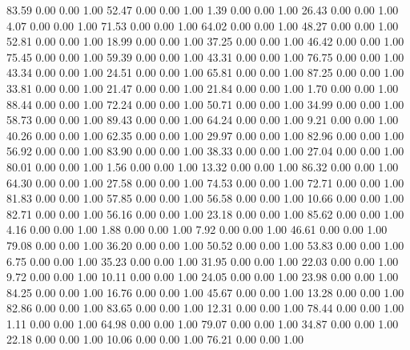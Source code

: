    83.59   0.00   0.00   1.00
   52.47   0.00   0.00   1.00
    1.39   0.00   0.00   1.00
   26.43   0.00   0.00   1.00
    4.07   0.00   0.00   1.00
   71.53   0.00   0.00   1.00
   64.02   0.00   0.00   1.00
   48.27   0.00   0.00   1.00
   52.81   0.00   0.00   1.00
   18.99   0.00   0.00   1.00
   37.25   0.00   0.00   1.00
   46.42   0.00   0.00   1.00
   75.45   0.00   0.00   1.00
   59.39   0.00   0.00   1.00
   43.31   0.00   0.00   1.00
   76.75   0.00   0.00   1.00
   43.34   0.00   0.00   1.00
   24.51   0.00   0.00   1.00
   65.81   0.00   0.00   1.00
   87.25   0.00   0.00   1.00
   33.81   0.00   0.00   1.00
   21.47   0.00   0.00   1.00
   21.84   0.00   0.00   1.00
    1.70   0.00   0.00   1.00
   88.44   0.00   0.00   1.00
   72.24   0.00   0.00   1.00
   50.71   0.00   0.00   1.00
   34.99   0.00   0.00   1.00
   58.73   0.00   0.00   1.00
   89.43   0.00   0.00   1.00
   64.24   0.00   0.00   1.00
    9.21   0.00   0.00   1.00
   40.26   0.00   0.00   1.00
   62.35   0.00   0.00   1.00
   29.97   0.00   0.00   1.00
   82.96   0.00   0.00   1.00
   56.92   0.00   0.00   1.00
   83.90   0.00   0.00   1.00
   38.33   0.00   0.00   1.00
   27.04   0.00   0.00   1.00
   80.01   0.00   0.00   1.00
    1.56   0.00   0.00   1.00
   13.32   0.00   0.00   1.00
   86.32   0.00   0.00   1.00
   64.30   0.00   0.00   1.00
   27.58   0.00   0.00   1.00
   74.53   0.00   0.00   1.00
   72.71   0.00   0.00   1.00
   81.83   0.00   0.00   1.00
   57.85   0.00   0.00   1.00
   56.58   0.00   0.00   1.00
   10.66   0.00   0.00   1.00
   82.71   0.00   0.00   1.00
   56.16   0.00   0.00   1.00
   23.18   0.00   0.00   1.00
   85.62   0.00   0.00   1.00
    4.16   0.00   0.00   1.00
    1.88   0.00   0.00   1.00
    7.92   0.00   0.00   1.00
   46.61   0.00   0.00   1.00
   79.08   0.00   0.00   1.00
   36.20   0.00   0.00   1.00
   50.52   0.00   0.00   1.00
   53.83   0.00   0.00   1.00
    6.75   0.00   0.00   1.00
   35.23   0.00   0.00   1.00
   31.95   0.00   0.00   1.00
   22.03   0.00   0.00   1.00
    9.72   0.00   0.00   1.00
   10.11   0.00   0.00   1.00
   24.05   0.00   0.00   1.00
   23.98   0.00   0.00   1.00
   84.25   0.00   0.00   1.00
   16.76   0.00   0.00   1.00
   45.67   0.00   0.00   1.00
   13.28   0.00   0.00   1.00
   82.86   0.00   0.00   1.00
   83.65   0.00   0.00   1.00
   12.31   0.00   0.00   1.00
   78.44   0.00   0.00   1.00
    1.11   0.00   0.00   1.00
   64.98   0.00   0.00   1.00
   79.07   0.00   0.00   1.00
   34.87   0.00   0.00   1.00
   22.18   0.00   0.00   1.00
   10.06   0.00   0.00   1.00
   76.21   0.00   0.00   1.00
